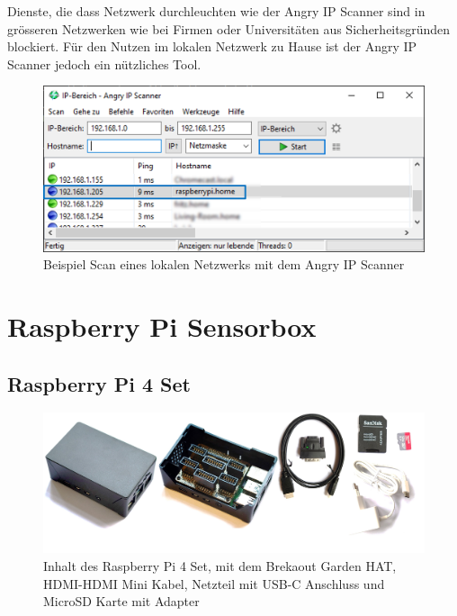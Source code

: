 \documentclass[
  11pt,
  a4paper,
  oneside, openany  ,captions=tableheading
]{scrbook}
\theoremstyle{remark}
\begin{document}
Dienste, die dass Netzwerk durchleuchten wie der Angry IP Scanner sind
in grösseren Netzwerken wie bei Firmen oder Universitäten aus
Sicherheitsgründen blockiert. Für den Nutzen im lokalen Netzwerk zu
Hause ist der Angry IP Scanner jedoch ein nützliches Tool.

\begin{figure}[H]

{\centering \includegraphics{images/angryip_scanner.png}

}

\caption{Beispiel Scan eines lokalen Netzwerks mit dem Angry IP Scanner}

\end{figure}%

\chapter{Raspberry Pi Sensorbox}\label{raspberry-pi-sensorbox}

\section{Raspberry Pi 4 Set}\label{raspberry-pi-4-set}

\begin{figure}[H]

{\centering \includegraphics{images/raspberry_pi_box.jpg}

}

\caption{Inhalt des Raspberry Pi 4 Set, mit dem Brekaout Garden HAT,
HDMI-HDMI Mini Kabel, Netzteil mit USB-C Anschluss und MicroSD Karte mit
Adapter}

\end{figure}%
\end{document}
